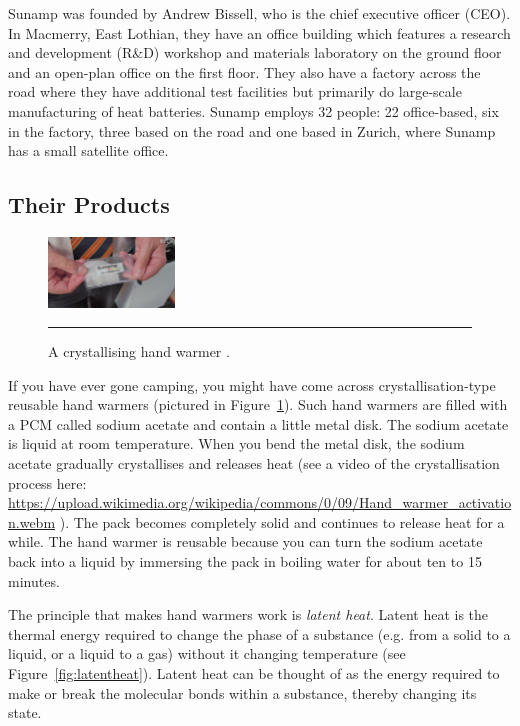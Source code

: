 Sunamp was founded by Andrew Bissell, who is the chief executive officer (CEO).
In Macmerry, East Lothian, they have an office building which features a research and development (R\&D) workshop and materials laboratory on the ground floor and an open-plan office on the first floor.
They also have a factory across the road where they have additional test facilities but primarily do large-scale manufacturing %
of heat batteries.
Sunamp employs 32 people: 22 office-based, six in the factory, three based on the road and one based in Zurich, where Sunamp has a small satellite office.





\subsection*{Their Products}

\begin{figure}
	\includegraphics[width=0.3\textwidth]{figures/sunamp-hand-warmer.png}
	\rule{0.3\textwidth}{0.5pt} %
	\caption{A crystallising hand warmer \citep{FullyCharged}.}
	\label{fig:handwarmer}
\end{figure}

If you have ever gone camping, you might have come across crystallisation-type reusable hand warmers (pictured in Figure~\ref{fig:handwarmer}).
Such hand warmers are filled with a PCM called sodium acetate and contain a little metal disk.
The sodium acetate is liquid at room temperature.
When you bend the metal disk, the sodium acetate gradually crystallises and releases heat 
(see a video of the crystallisation process here: 
\url{https://upload.wikimedia.org/wikipedia/commons/0/09/Hand_warmer_activation.webm} \citep{HandWarmerActivation}).
The pack becomes completely solid and continues to release heat for a while.
The hand warmer is reusable because you can turn the sodium acetate back into a liquid by immersing the pack in boiling water for about ten to 15 minutes.

The principle that makes hand warmers work is \emph{latent heat}.
Latent heat is the thermal energy required to change the phase of a substance (e.g. from a solid to a liquid, or a liquid to a gas) without it changing temperature (see Figure~\ref{fig:latentheat}).
Latent heat can be thought of as the energy required to make or break the molecular bonds within a substance, thereby changing its state.


